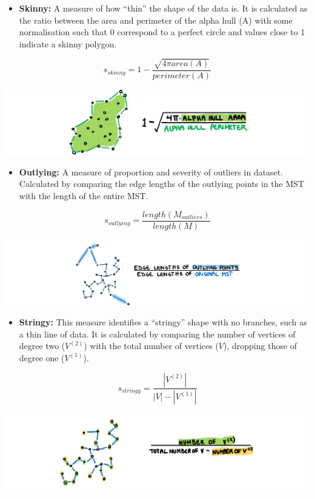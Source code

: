 \begin{itemize}
\tightlist
\item
  \textbf{Skinny:} A measure of how ``thin'' the shape of the data is.
  It is calculated as the ratio between the area and perimeter of the
  alpha hull (A) with some normalisation such that 0 correspond to a
  perfect circle and values close to 1 indicate a skinny polygon.
\end{itemize}

\[s_{skinny}= 1-\frac{\sqrt{4\pi area(A)}}{perimeter(A)}\]

\includegraphics{figures/drawskinny.png}

\begin{itemize}
\tightlist
\item
  \textbf{Outlying:} A measure of proportion and severity of outliers in
  dataset. Calculated by comparing the edge lengths of the outlying
  points in the MST with the length of the entire MST.
\end{itemize}

\[s_{outlying}=\frac{length(M_{outliers})}{length(M)}\]

\includegraphics{figures/drawoutlying.png}

\begin{itemize}
\tightlist
\item
  \textbf{Stringy:} This measure identifies a ``stringy'' shape with no
  branches, such as a thin line of data. It is calculated by comparing
  the number of vertices of degree two (\(V^{(2)}\)) with the total
  number of vertices (\(V\)), dropping those of degree one
  (\(V^{(1)}\)).
\end{itemize}

\[s_{stringy} = \frac{|V^{(2)}|}{|V|-|V^{(1)}|}\]

\includegraphics{figures/drawstringy.png}

